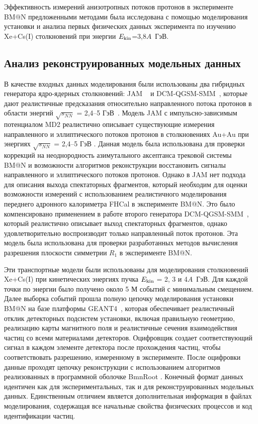 Эффективность измерений анизотропных потоков протонов в эксперименте BM@N  предложенными
методами была исследована с помощью моделирования установки и анализа первых физических данных эксперимента по изучению Xe+Cs(I) столкновений при энергии $E_{\rm kin}$=3,8$A$~ГэВ.

\subsection{Анализ реконструированных модельных данных \label{bmnsimul}}

В качестве входных данных моделирования были использованы два гибридных генератора ядро-ядерных столкновений: JAM ~\cite{Zhang:2018wlk, nara2019jam, Nara:2019qfd}  
и  DCM-QGSM-SMM~\cite{Botvina:1994vj,Baznat:2019iom}, которые дают реалистичные предсказания 
относительно направленного потока протонов в области энергий $\sqrt{s_{NN}}$  = 2,4--5 ГэВ~\cite{Parfenov:2022brq}. 
Модель JAM с импульсно-зависимым потенциалом MD2 реалистично описывает существующие измерения направленного и эллиптического потоков протонов
в столкновениях Au+Au при энергиях $\sqrt{s_{NN}}$ = 2,4--5 ГэВ \cite{Nara:2019qfd, Parfenov:2022brq}. 
Данная модель была использована для проверки коррекций на неоднородность азимутального аксептанса трековой системы BM@N и 
возможности алгоритмов реконструкции восстановить сигналы направленного и эллиптического потоков протонов. 
Однако в  JAM нет подхода  для описания выхода спектаторных фрагментов, который необходим для оценки возможности измерений с использованием реалистичного моделирования переднего адронного калориметра FHCal в эксперименте BM@N.
Это было компенсировано применением в работе второго генератора DCM-QGSM-SMM~\cite{Botvina:1994vj,Baznat:2019iom}, который 
реалистично описывает выход спектаторных фрагментов, однако удовлетворительно воспроизводит только направленный поток протонов.
Эта модель была использована для проверки разработанных методов вычисления  разрешения плоскости симметрии $R_1$ в эксперименте BM@N.

Эти транспортные модели были использованы для моделирования столкновений Xe+Cs(I) при кинетических энергиях пучка $E_{\rm kin}$ = 2, 3 и 4$A$~ГэВ. Для каждой точки 
по энергии было получено около 5 М событий с минимальным смещением. 
Далее выборка событий прошла полную цепочку  моделирования установки  BM@N на базе платформы GEANT4~\cite{Apostolakis:2009egq}, которая обеспечивает реалистичный отклик детекторных подсистем установки, включая правильную геометрию, реализацию карты магнитного поля и реалистичные сечения взаимодействия частиц со всеми материалами детекторов. 
Оцифровщик создает соответствующий сигнал в каждом элементе детектора после прохождения частиц,
чтобы соответствовать разрешению, измеренному в эксперименте.  
После оцифровки данные проходят цепочку реконструкции с
использованием алгоритмов реализованных в программной оболочке BmnRoot \cite{Batyuk:2019ohs}. 
Конечный формат данных идентичен как  для экспериментальных, так и для реконструированных модельных данных. 
Единственным отличием является дополнительная информация в файлах моделирования, содержащая все начальные свойства физических процессов и код идентификации частиц.

